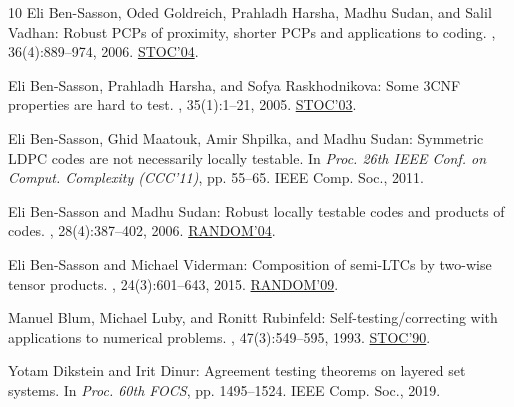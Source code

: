 \documentclass[11pt]{article}
\numberwithin{equation}{section}
\theoremstyle{definition}
\theoremstyle{plain}
\theoremstyle{plain}
\begin{document}
\begin{thebibliography}{10}
{\sc Eli {Ben-Sasson}, Oded Goldreich, Prahladh Harsha, Madhu Sudan, and Salil
  Vadhan}: Robust {PCP}s of proximity, shorter {PCP}s and applications to
  coding.
, 36(4):889--974, 2006.
\newblock \prelim \href{https://doi.org/10.1145/1007352.1007361}{STOC'04}.

{\sc Eli {Ben-Sasson}, Prahladh Harsha, and Sofya Raskhodnikova}: Some {3CNF}
  properties are hard to test.
, 35(1):1--21, 2005.
\newblock \prelim \href{https://doi.org/10.1145/780542.780594}{STOC'03}.
\newblock [\epfmtdoi{10.1137/S0097539704445445}]

{\sc Eli Ben{-}Sasson, Ghid Maatouk, Amir Shpilka, and Madhu Sudan}: Symmetric
  {LDPC} codes are not necessarily locally testable.
\newblock In {\em Proc. 26th IEEE Conf. on Comput. Complexity (CCC'11)}, pp.
  55--65. IEEE Comp. Soc., 2011.

{\sc Eli Ben{-}Sasson and Madhu Sudan}: Robust locally testable codes and
  products of codes.
, 28(4):387--402, 2006.
\newblock \prelim
  \href{https://doi.org/10.1007/978-3-540-27821-4\_26}{RANDOM'04}.

{\sc Eli Ben{-}Sasson and Michael Viderman}: Composition of semi-{LTC}s by
  two-wise tensor products.
, 24(3):601--643, 2015.
\newblock \prelim
  \href{https://doi.org/10.1007/978-3-642-03685-9\_29}{RANDOM'09}.

{\sc Manuel Blum, Michael Luby, and Ronitt Rubinfeld}: Self-testing/correcting
  with applications to numerical problems.
, 47(3):549--595, 1993.
\newblock \prelim \href{https://doi.org/10.1145/100216.100225}{STOC'90}.
\newblock [\epfmtdoi{10.1016/0022-0000(93)90044-W}]

{\sc Yotam Dikstein and Irit Dinur}: Agreement testing theorems on layered set
  systems.
\newblock In {\em Proc. 60th FOCS}, pp. 1495--1524. IEEE Comp. Soc., 2019.


\end{thebibliography}
\end{document}
